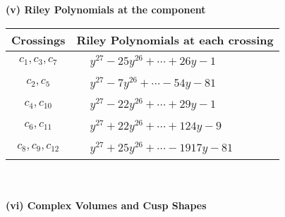 \documentclass[1p]{elsarticle_modified}
\theoremstyle{definition}
\begin{document}
\newpage\renewcommand{\arraystretch}{1}
\flushleft \textbf{(v) Riley Polynomials at the component}\newline \\
\begin{tabular}{m{50pt}|m{274pt}}
Crossings & \hspace{64pt}Riley Polynomials at each crossing \\
\hline $$\begin{aligned}c_{1},c_{3},c_{7}\end{aligned}$$&$\begin{aligned}
&y^{27}-25 y^{26}+\cdots+26 y-1
\end{aligned}$\\
\hline $$\begin{aligned}c_{2},c_{5}\end{aligned}$$&$\begin{aligned}
&y^{27}-7 y^{26}+\cdots-54 y-81
\end{aligned}$\\
\hline $$\begin{aligned}c_{4},c_{10}\end{aligned}$$&$\begin{aligned}
&y^{27}-22 y^{26}+\cdots+29 y-1
\end{aligned}$\\
\hline $$\begin{aligned}c_{6},c_{11}\end{aligned}$$&$\begin{aligned}
&y^{27}+22 y^{26}+\cdots+124 y-9
\end{aligned}$\\
\hline $$\begin{aligned}c_{8},c_{9},c_{12}\end{aligned}$$&$\begin{aligned}
&y^{27}+25 y^{26}+\cdots-1917 y-81
\end{aligned}$\\
\hline
\end{tabular}\\~\\
\newpage\flushleft \textbf{(vi) Complex Volumes and Cusp Shapes}
\end{document}
